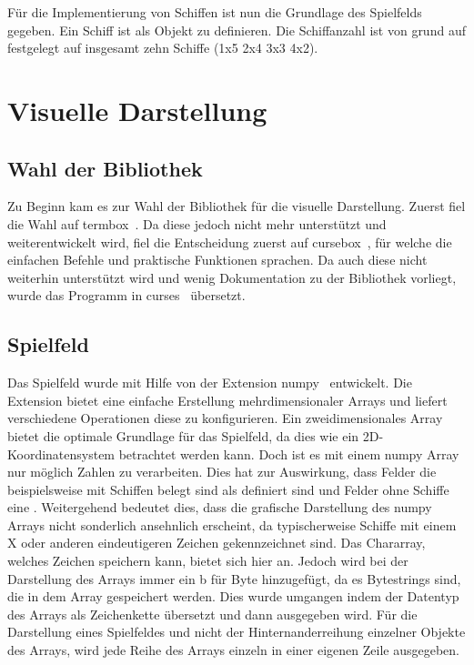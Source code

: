 \documentclass{llncs}
\begin{document}
Für die Implementierung von Schiffen ist nun die Grundlage des Spielfelds gegeben. Ein Schiff ist als Objekt zu definieren.
Die Schiffanzahl ist von grund auf festgelegt auf insgesamt zehn Schiffe (1x5 2x4 3x3 4x2).

\section{Visuelle Darstellung}

\subsection{Wahl der Bibliothek}

Zu Beginn kam es zur Wahl der Bibliothek für die visuelle Darstellung. Zuerst fiel die Wahl auf termbox~\cite{Termbox}. Da diese jedoch nicht mehr unterstützt und weiterentwickelt wird, fiel die Entscheidung zuerst auf cursebox~\cite{Cursebox}, für welche
die einfachen Befehle und praktische Funktionen sprachen. Da auch diese nicht weiterhin unterstützt wird und wenig Dokumentation zu der Bibliothek vorliegt, wurde das Programm in curses~\cite{Curses} übersetzt.

\subsection{Spielfeld}

Das Spielfeld wurde mit Hilfe von der Extension numpy~\cite{Numpy} entwickelt. Die Extension bietet eine einfache Erstellung mehrdimensionaler Arrays und liefert verschiedene Operationen diese zu konfigurieren.
Ein zweidimensionales Array bietet die optimale Grundlage für das Spielfeld, da dies wie ein 2D-Koordinatensystem betrachtet werden kann.
Doch ist es mit einem numpy Array nur möglich Zahlen zu verarbeiten. Dies hat zur Auswirkung, dass Felder die beispielsweise mit Schiffen belegt sind als \grqq{} definiert sind und Felder ohne Schiffe eine \grqq{}.
Weitergehend bedeutet dies, dass die grafische Darstellung des numpy Arrays nicht sonderlich ansehnlich erscheint, da typischerweise Schiffe mit einem \glqq X\grqq{} oder anderen eindeutigeren Zeichen gekennzeichnet sind. 
Das Chararray, welches Zeichen speichern kann, bietet sich hier an. Jedoch wird bei der Darstellung des Arrays immer ein \glqq b\grqq{} für Byte hinzugefügt, da es Bytestrings sind, die in dem Array gespeichert werden. 
Dies wurde umgangen indem der Datentyp des Arrays als Zeichenkette übersetzt und dann ausgegeben wird. Für die Darstellung eines Spielfeldes und nicht der Hinternanderreihung einzelner Objekte des Arrays, wird jede Reihe des 
Arrays einzeln in einer eigenen Zeile ausgegeben. 
\end{document}
